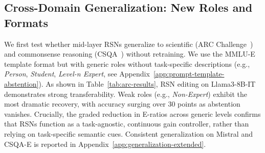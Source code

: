 \documentclass{article}
\begin{document}
\subsection{Cross-Domain Generalization: New Roles and Formats}
\label{sec:cross-domain}
We first test whether mid-layer RSNs generalize to scientific (ARC Challenge~\cite{clark2018arc}) and commonsense reasoning (CSQA~\cite{talmor2019commonsenseqa}) without retraining. We use the MMLU-E template format but with generic roles without task-specific descriptions (e.g., \emph{Person}, \emph{Student}, \emph{Level-n Expert}, see Appendix~\ref{app:prompt-template-abstention}). As shown in Table~\ref{tab:arc-results}, RSN editing on Llama3-8B-IT demonstrates strong transferability. Weak roles (e.g., \emph{Non-Expert}) exhibit the most dramatic recovery, with accuracy surging over 30 points as abstention vanishes. Crucially, the graded reduction in E-ratios across generic levels confirms that RSNs function as a task-agnostic, continuous gain controller, rather than relying on task-specific semantic cues. Consistent generalization on Mistral and CSQA-E is reported in Appendix~\ref{app:generalization-extended}.
\end{document}
